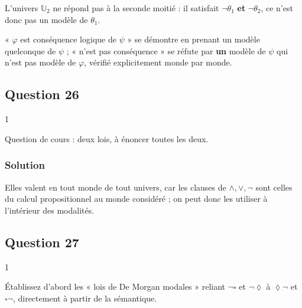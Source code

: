 \documentclass[11pt,a4paper]{article}
\providecommand{\Box}{\square}
\providecommand{\Diamond}{\lozenge}
\newcommand{\equationajustee}[1]{%
  \sbox{\boiteequation}{$\displaystyle #1$}%
  \ifdim\wd\boiteequation>\linewidth
    \[\resizebox{\linewidth}{!}{\usebox{\boiteequation}}\]%
  \else
    \[#1\]%
  \fi}
\begin{document}
\begin{piege}

L'univers \(\mathbb U_2\) ne répond pas à la seconde moitié : il satisfait \(\neg\theta_1\) \textbf{et} \(\neg\theta_2\), ce n'est donc pas un modèle de \(\theta_1\).

\end{piege}

\begin{methode}

« \(\varphi\) est conséquence logique de \(\psi\) » se démontre en prenant un modèle quelconque de \(\psi\) ; « n'est pas conséquence » se réfute par \textbf{un} modèle de \(\psi\) qui n'est pas modèle de \(\varphi\), vérifié explicitement monde par monde.

\end{methode}

\hypertarget{question-26}{%
\subsection{Question 26}\label{question-26}}

\begin{indication}{1}

Question de cours : deux lois, à énoncer toutes les deux.

\end{indication}

\hypertarget{solution-25}{%
\subsubsection{Solution}\label{solution-25}}

\equationajustee{\boxed{\begin{aligned}
\neg(\varphi\wedge\psi)&\equiv\neg\varphi\vee\neg\psi\\
\neg(\varphi\vee\psi)&\equiv\neg\varphi\wedge\neg\psi
\end{aligned}}}

Elles valent en tout monde de tout univers, car les clauses de \(\wedge,\vee,\neg\) sont celles du calcul propositionnel au monde considéré ; on peut donc les utiliser à l'intérieur des modalités.

\hypertarget{question-27}{%
\subsection{Question 27}\label{question-27}}

\begin{indication}{1}

Établissez d'abord les « lois de De Morgan modales » reliant \(\neg\Box\) et \(\neg\Diamond\) à \(\Diamond\neg\) et \(\Box\neg\), directement à partir de la sémantique.

\end{indication}
\end{document}
